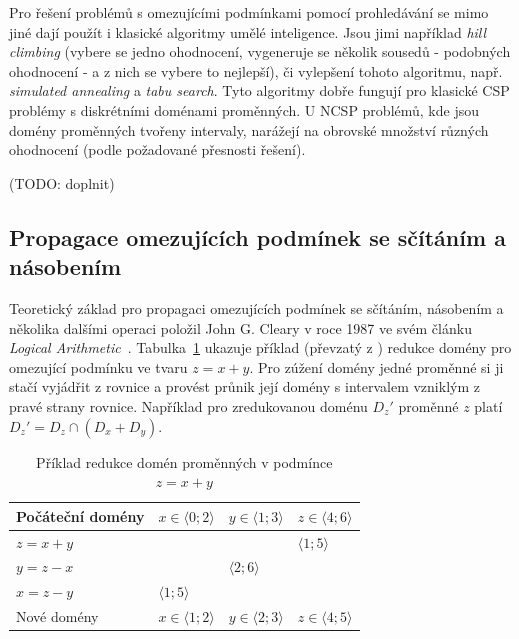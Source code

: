 Pro řešení problémů s omezujícími podmínkami pomocí prohledávání se mimo jiné dají použít i klasické algoritmy umělé inteligence. Jsou jimi například \emph{hill climbing} (vybere se jedno ohodnocení, vygeneruje se několik sousedů - podobných ohodnocení - a z nich se vybere to nejlepší), či vylepšení tohoto algoritmu, např. \emph{simulated annealing} a \emph{tabu search}. Tyto algoritmy dobře fungují pro klasické CSP problémy s diskrétními doménami proměnných. U NCSP problémů, kde jsou domény proměnných tvořeny intervaly, narážejí na obrovské množství různých ohodnocení (podle požadované přesnosti řešení).

(TODO: doplnit)



\subsection{Propagace omezujících podmínek se sčítáním a násobením}
\label{ch:narrowingHowWorks}
Teoretický základ pro propagaci omezujících podmínek se sčítáním, násobením a několika dalšími operaci položil John G. Cleary v roce 1987 ve svém článku \emph{Logical Arithmetic}~\cite{cleary87}. Tabulka~\ref{narrowingTable} ukazuje příklad (převzatý z \cite{cleary87}) redukce domény pro omezující podmínku ve tvaru $z = x + y$. Pro zúžení domény jedné proměnné si ji stačí vyjádřit z rovnice a provést průnik její domény s intervalem vzniklým z pravé strany rovnice. Například pro zredukovanou doménu $D_z'$ proměnné $z$ platí $D_z' = D_z \cap (D_x + D_y)$.



\begin{table}
\centering
\label{narrowingTable}
\begin{tabular}{|l|l|l|l|}
\hline
 Počáteční domény & $x \in \langle 0;2 \rangle$ & $y \in \langle 1;3 \rangle$ & $z \in \langle 4;6 \rangle$  \\ \hline
 $z = x+y$  &  & &  $\langle 1;5 \rangle$  \\ \hline
 $y = z-x$  & & $\langle 2;6 \rangle$  &  \\ \hline
 $x = z-y$  & $\langle 1;5 \rangle$  &  &  \\ \hline
 Nové domény & $x \in \langle 1;2 \rangle$ & $y \in \langle 2;3 \rangle$ & $z \in \langle 4;5 \rangle$ \\ \hline
\end{tabular}
\caption{Příklad redukce domén proměnných v podmínce $z = x + y$}
\end{table}


